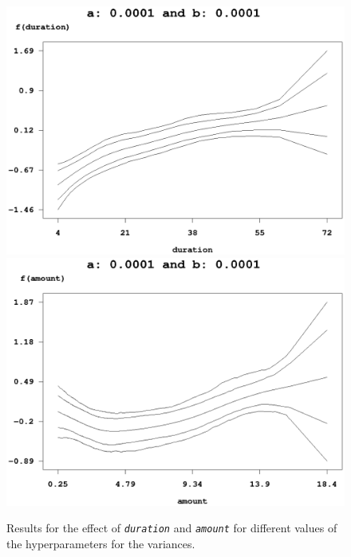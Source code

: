\begin{figure}[ht]
\begin{center}
\vspace{0.5cm}
\includegraphics[scale=0.4]{grafiken/credit_duration_a0001b0001.ps} \hspace{0.3cm}
\includegraphics[scale=0.4]{grafiken/credit_amount_a0001b0001.ps}
\end{center}
{\em\caption{ \label{credit_varhyper} Results for the effect of
{\em\tt duration} and {\em\tt amount} for different values of the
hyperparameters for the variances.}}
\end{figure}
